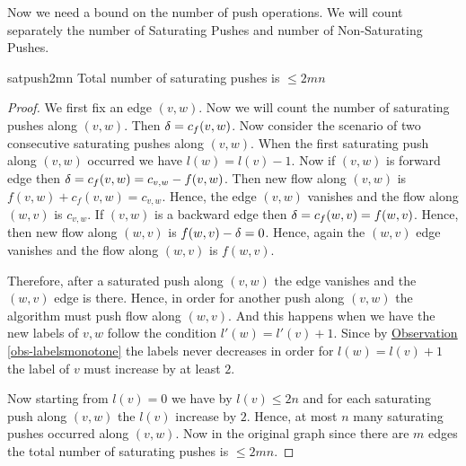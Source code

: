 Now we need a bound on the number of push operations. We will count separately the number of Saturating Pushes and number of Non-Saturating Pushes.
\begin{lemma}{}{satpush2mn}
	Total number of saturating pushes is $\leq 2mn$
\end{lemma}
\begin{proof}
	We first fix an edge $(v,w)$. Now we will count the number of saturating pushes along $(v,w)$. Then $\delta=c_f(v,w)$.  Now consider the scenario of  two consecutive saturating pushes along $(v,w)$. When the first saturating push along $(v,w)$ occurred we have $l(w)=l(v)-1$. Now if $(v,w)$ is forward edge then $\delta=c_f(v,w)=c_{v,w}-f(v,w)$. Then new flow along $(v,w)$ is $f(v,w)+c_f(v,w)=c_{v,w}$. Hence, the edge $(v,w)$ vanishes and the flow along $(w,v)$ is $c_{v,w}$. If $(v,w)$ is a backward edge then $\delta=c_f(w,v)=f(w,v)$. Hence, then new flow along $(w,v)$ is $f(w,v)-\delta=0$. Hence, again the $(w,v)$ edge vanishes and the flow along $(w,v)$ is $f(w,v)$.

	\begin{center}
	\end{center}

	Therefore, after a saturated push along $(v,w)$ the edge vanishes and the $(w,v)$ edge is there. Hence, in order for another push along $(v,w)$ the algorithm must push flow along $(w,v)$. And this happens when we have the new labels of $v,w$ follow the condition $l'(w)=l'(v)+1$. Since by \hyperref[obs-labelsmonotone]{Observation \ref{obs-labelsmonotone}} the labels never decreases in order for $l(w)=l(v)+1$ the label of $v$ must  increase  by at least $2$.

	Now starting from $l(v)=0$ we have by  $l(v)\leq 2n$ and for each saturating push along $(v,w)$ the $l(v)$ increase by $2$. Hence, at most $n$ many saturating pushes occurred along $(v,w)$. Now in the original graph since there are $m$ edges the total number of saturating pushes is $\leq 2mn$.
\end{proof}


